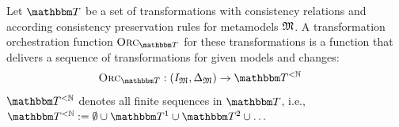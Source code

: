 \begin{definition} \label{def:orchestrationfunction}
    Let $\transformationset{T}$ be a set of transformations with consistency relations and according consistency preservation rules for metamodels $\mathfrak{M}$.
    A transformation orchestration function $\orcfunction{\transformationset{T}}$ for these transformations is a function that delivers a sequence of transformations for given models and changes:
    \begin{align*}
        &
        \orcfunction{\transformationset{T}} : (\metamodeltupleinstanceset{M}, \changeuniverse{\metamodeltuple{M}}) \rightarrow \transformationset{T}^{< \mathbb{N}}
    \end{align*}
    $\transformationset{T}^{< \mathbb{N}}$ denotes all finite sequences in $\transformationset{T}$, i.e., $\transformationset{T}^{< \mathbb{N}} \equalsperdefinition \emptyset \cup \transformationset{T}^1 \cup \transformationset{T}^2 \cup \dots$
\end{definition}


